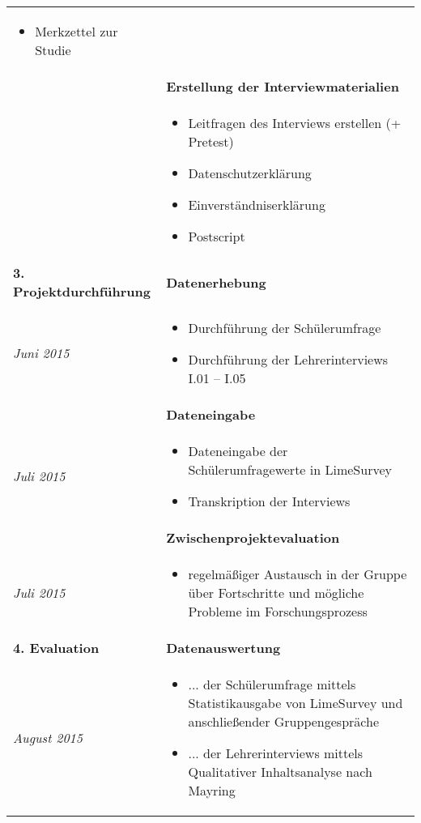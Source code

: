 \begin{longtable}{l|p{9.8cm}}
\begin{itemize}[nosep,topsep=-0.6cm]
		\item Merkzettel zur Studie
	\end{itemize} \\
	& \textbf{Erstellung der Interviewmaterialien} \\*
	& 
	\vspace*{-0.6cm}
	\begin{itemize}[nosep,topsep=-0.6cm]
		\item Leitfragen des Interviews erstellen (+ Pretest)
		\item Datenschutzerklärung
		\item Einverständniserklärung
		\item Postscript
	\end{itemize} \\
	
	\textbf{3. Projektdurchführung} & \textbf{Datenerhebung} \\*
	\emph{Juni 2015} &
	\vspace*{-0.6cm}
	\begin{itemize}[nosep,topsep=-0.6cm]
		\item Durchführung der Schülerumfrage
		\item Durchführung der Lehrerinterviews I.01 -- I.05
	\end{itemize} \\
	& \textbf{Dateneingabe} \\*
	\emph{Juli 2015} &
	\vspace*{-0.6cm}
	\begin{itemize}[nosep,topsep=-0.6cm]
		\item Dateneingabe der Schülerumfragewerte in LimeSurvey
		\item Transkription der Interviews
	\end{itemize} \\
	& \textbf{Zwischenprojektevaluation} \\*
	\emph{Juli 2015} &
	\vspace*{-0.6cm}
	\begin{itemize}[nosep,topsep=-0.6cm]
		\item regelmäßiger Austausch in der Gruppe über Fortschritte und mögliche Probleme im Forschungsprozess
	\end{itemize} \\
	
	\textbf{4. Evaluation} & \textbf{Datenauswertung} \\*
	\emph{August 2015} &
	\vspace*{-0.6cm}
	\begin{itemize}[nosep,topsep=-0.6cm]
		\item ... der Schülerumfrage mittels Statistikausgabe von LimeSurvey und anschließender Gruppengespräche
		\item ... der Lehrerinterviews mittels Qualitativer Inhaltsanalyse nach Mayring
	\end{itemize} \\
	

\end{longtable}
